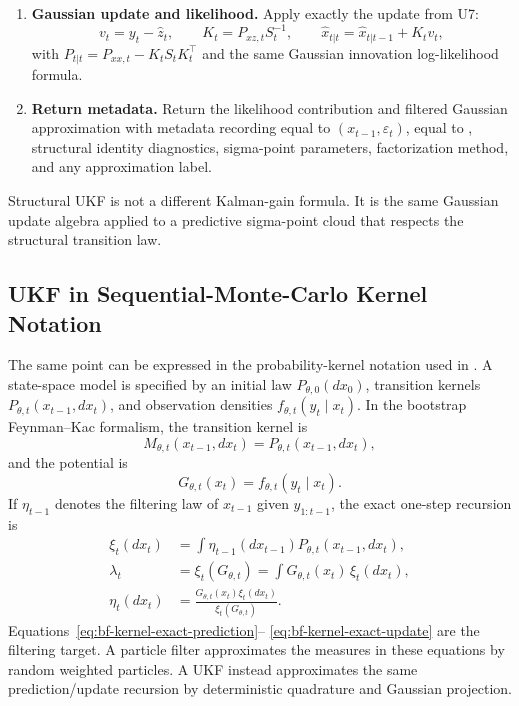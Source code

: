 \begin{enumerate}[label=\textbf{S\arabic*.}]
\begin{align}
      S_t &=
        \sum_j w_j^{(c)}(z_t^{(j)}-\hat z_t)(z_t^{(j)}-\hat z_t)^\top + R_t,\\
      P_{xz,t} &=
        \sum_j w_j^{(c)}
        (x_t^{(j)}-\hat x_{t|t-1})(z_t^{(j)}-\hat z_t)^\top .
    \end{align}
  \item \textbf{Gaussian update and likelihood.}  Apply exactly the update from
    U7:
    \[
      v_t=y_t-\hat z_t,\qquad
      K_t=P_{xz,t}S_t^{-1},\qquad
      \hat x_{t|t}=\hat x_{t|t-1}+K_tv_t,
    \]
    with $P_{t|t}=P_{xx,t}-K_tS_tK_t^\top$ and the same Gaussian innovation
    log-likelihood formula.
  \item \textbf{Return metadata.}  Return the likelihood contribution and
    filtered Gaussian approximation with metadata recording
     equal to $(x_{t-1},\varepsilon_t)$,
     equal to , structural
    identity diagnostics, sigma-point parameters, factorization method, and any
    approximation label.
\end{enumerate}
Structural UKF is not a different Kalman-gain formula.  It is the same Gaussian
update algebra applied to a predictive sigma-point cloud that respects the
structural transition law.

\subsection{UKF in Sequential-Monte-Carlo Kernel Notation}
\label{sec:bf-ukf-kernel-notation}

The same point can be expressed in the probability-kernel notation used in
\citet{chopin2020introduction}.  A state-space model is specified by an initial
law $P_{\theta,0}(dx_0)$, transition kernels
$P_{\theta,t}(x_{t-1},dx_t)$, and observation densities
$f_{\theta,t}(y_t\mid x_t)$.  In the bootstrap Feynman--Kac formalism, the
transition kernel is
\[
  M_{\theta,t}(x_{t-1},dx_t)=P_{\theta,t}(x_{t-1},dx_t),
\]
and the potential is
\[
  G_{\theta,t}(x_t)=f_{\theta,t}(y_t\mid x_t).
\]
If $\eta_{t-1}$ denotes the filtering law of $x_{t-1}$ given
$y_{1:t-1}$, the exact one-step recursion is
\begin{align}
  \xi_t(dx_t)
    &=
    \int \eta_{t-1}(dx_{t-1})
      P_{\theta,t}(x_{t-1},dx_t),
    \label{eq:bf-kernel-exact-prediction}\\
  \lambda_t
    &=
    \xi_t(G_{\theta,t})
    =
    \int G_{\theta,t}(x_t)\,\xi_t(dx_t),
    \label{eq:bf-kernel-exact-likelihood-factor}\\
  \eta_t(dx_t)
    &=
    \frac{G_{\theta,t}(x_t)\xi_t(dx_t)}{\xi_t(G_{\theta,t})}.
    \label{eq:bf-kernel-exact-update}
\end{align}
Equations~\eqref{eq:bf-kernel-exact-prediction}--%
\eqref{eq:bf-kernel-exact-update} are the filtering target.  A particle filter
approximates the measures in these equations by random weighted particles.  A
UKF instead approximates the same prediction/update recursion by deterministic
quadrature and Gaussian projection.

